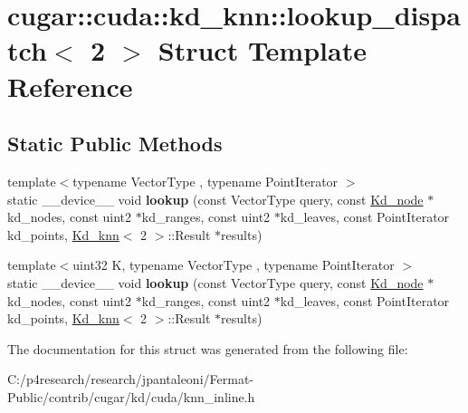 \hypertarget{structcugar_1_1cuda_1_1kd__knn_1_1lookup__dispatch_3_012_01_4}{}\section{cugar\+:\+:cuda\+:\+:kd\+\_\+knn\+:\+:lookup\+\_\+dispatch$<$ 2 $>$ Struct Template Reference}
\label{structcugar_1_1cuda_1_1kd__knn_1_1lookup__dispatch_3_012_01_4}
\subsection*{Static Public Methods}
\begin{DoxyCompactItemize}
\item 
\mbox{\label{structcugar_1_1cuda_1_1kd__knn_1_1lookup__dispatch_3_012_01_4_aaf2f704c26315b16788209a3243121bf}} 
{\footnotesize template$<$typename Vector\+Type , typename Point\+Iterator $>$ }\\static \+\_\+\+\_\+device\+\_\+\+\_\+ void {\bfseries lookup} (const Vector\+Type query, const \hyperlink{structcugar_1_1_kd__node}{Kd\+\_\+node} $\ast$kd\+\_\+nodes, const uint2 $\ast$kd\+\_\+ranges, const uint2 $\ast$kd\+\_\+leaves, const Point\+Iterator kd\+\_\+points, \hyperlink{structcugar_1_1cuda_1_1_kd__knn}{Kd\+\_\+knn}$<$ 2 $>$\+::Result $\ast$results)
\item 
\mbox{\label{structcugar_1_1cuda_1_1kd__knn_1_1lookup__dispatch_3_012_01_4_a2b097212676cf2049c0c1286d1d324da}} 
{\footnotesize template$<$uint32 K, typename Vector\+Type , typename Point\+Iterator $>$ }\\static \+\_\+\+\_\+device\+\_\+\+\_\+ void {\bfseries lookup} (const Vector\+Type query, const \hyperlink{structcugar_1_1_kd__node}{Kd\+\_\+node} $\ast$kd\+\_\+nodes, const uint2 $\ast$kd\+\_\+ranges, const uint2 $\ast$kd\+\_\+leaves, const Point\+Iterator kd\+\_\+points, \hyperlink{structcugar_1_1cuda_1_1_kd__knn}{Kd\+\_\+knn}$<$ 2 $>$\+::Result $\ast$results)
\end{DoxyCompactItemize}


The documentation for this struct was generated from the following file\+:\begin{DoxyCompactItemize}
\item 
C\+:/p4research/research/jpantaleoni/\+Fermat-\/\+Public/contrib/cugar/kd/cuda/knn\+\_\+inline.\+h\end{DoxyCompactItemize}
